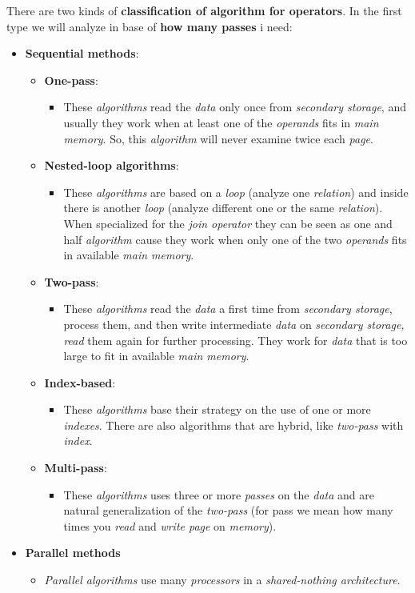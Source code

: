 \documentclass{article}
\begin{document}
There are two kinds of \textbf{classification of algorithm for operators}. In the first type we will analyze in base of \textbf{how many passes} i need:
\begin{itemize}
\item \textbf{Sequential methods}:
\begin{itemize}
\item \textbf{One-pass}: 
\begin{itemize}
\item These \emph{algorithms} read the \emph{data} only once from \emph{secondary storage}, and usually they work when at least one of the \emph{operands} fits in \emph{main memory}. So, this \emph{algorithm} will never examine twice each \emph{page}. 
\end{itemize}
\item \textbf{Nested-loop algorithms}:
\begin{itemize}
\item These \emph{algorithms} are based on a \emph{loop} (analyze one \emph{relation}) and inside there is another \emph{loop} (analyze different one or the same \emph{relation}). When specialized for the \emph{join operator} they can be seen as one and half \emph{algorithm} cause they work when only one of the two \emph{operands} fits in available \emph{main memory}. 
\end{itemize}
\item \textbf{Two-pass}:
\begin{itemize}
\item These \emph{algorithms} read the \emph{data} a first time from \emph{secondary storage}, process them, and then write intermediate \emph{data} on \emph{secondary storage, read} them again for further processing. They work for \emph{data} that is too large to fit in available \emph{main memory}.
\end{itemize}
\item \textbf{Index-based}:
\begin{itemize}
\item These \emph{algorithms} base their strategy on the use of one or more \emph{indexes}. There are also algorithms that are hybrid, like \emph{two-pass} with \emph{index}. 
\end{itemize}
\item \textbf{Multi-pass}:
\begin{itemize}
\item These \emph{algorithms} uses three or more \emph{passes} on the \emph{data} and are natural generalization of the \emph{two-pass} (for pass we mean how many times you \emph{read} and\emph{ write page} on \emph{memory}).
\end{itemize}
\end{itemize}
\item \textbf{Parallel methods}
\begin{itemize}
\item \emph{Parallel algorithms} use many \emph{processors} in a \emph{shared-nothing architecture}. 
\end{itemize}
\end{itemize}
\end{document}
